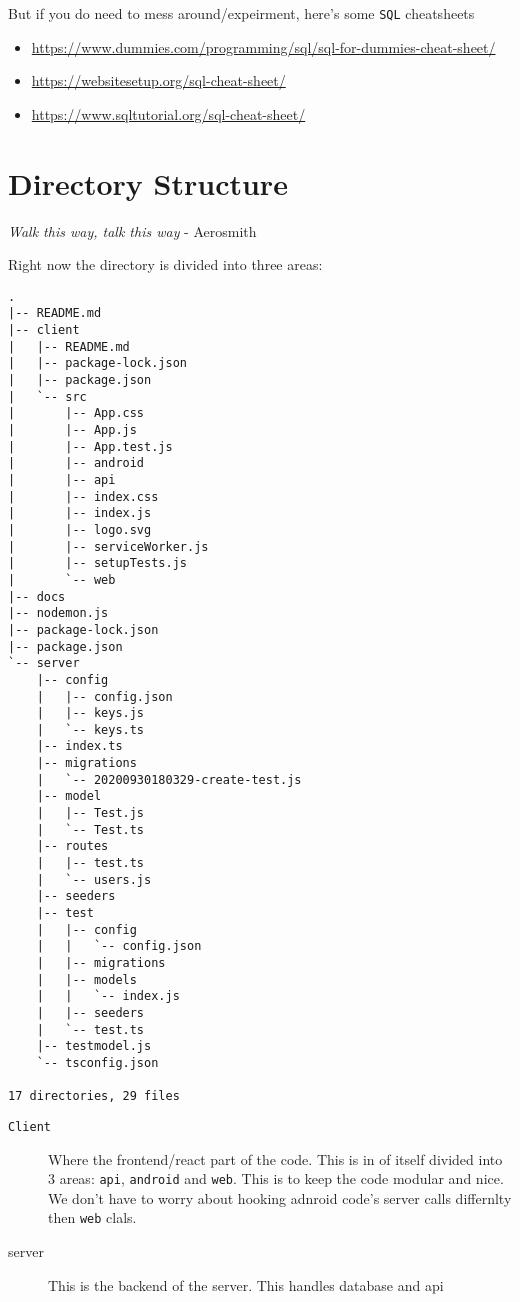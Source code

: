 \documentclass[11pt]{article}
\begin{document}
But if you do need to mess around/expeirment, here's some \texttt{SQL} cheatsheets
\begin{itemize}
\item \url{https://www.dummies.com/programming/sql/sql-for-dummies-cheat-sheet/}
\item \url{https://websitesetup.org/sql-cheat-sheet/}
\item \url{https://www.sqltutorial.org/sql-cheat-sheet/}
\end{itemize}

\subsubsection*{}
\label{sec:orgf214317}

\section*{Directory Structure}
\label{sec:orgdbddbd5}
\begin{center}
\emph{Walk this way, talk this way} - Aerosmith
\end{center}
Right now the directory is divided into three areas: 
\begin{verbatim}
.
|-- README.md
|-- client
|   |-- README.md
|   |-- package-lock.json
|   |-- package.json
|   `-- src
|       |-- App.css
|       |-- App.js
|       |-- App.test.js
|       |-- android
|       |-- api
|       |-- index.css
|       |-- index.js
|       |-- logo.svg
|       |-- serviceWorker.js
|       |-- setupTests.js
|       `-- web
|-- docs
|-- nodemon.js
|-- package-lock.json
|-- package.json
`-- server
    |-- config
    |   |-- config.json
    |   |-- keys.js
    |   `-- keys.ts
    |-- index.ts
    |-- migrations
    |   `-- 20200930180329-create-test.js
    |-- model
    |   |-- Test.js
    |   `-- Test.ts
    |-- routes
    |   |-- test.ts
    |   `-- users.js
    |-- seeders
    |-- test
    |   |-- config
    |   |   `-- config.json
    |   |-- migrations
    |   |-- models
    |   |   `-- index.js
    |   |-- seeders
    |   `-- test.ts
    |-- testmodel.js
    `-- tsconfig.json

17 directories, 29 files
\end{verbatim}

\begin{description}
\item[{\texttt{Client}}] Where the frontend/react part of the code. This is in of itself divided into 3 areas: \texttt{api}, \texttt{android} and \texttt{web}. This is to keep the code modular and nice. We don't have to worry about hooking adnroid code's server calls differnlty then \texttt{web} clals.
\item[{server}] This is the backend of the server. This handles database and api
\end{description}
\end{document}
